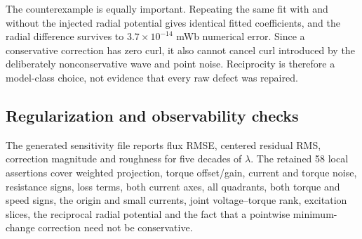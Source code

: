 The counterexample is equally important. Repeating the same fit with and without
the injected radial potential gives identical fitted coefficients, and the
radial difference survives to $3.7\times10^{-14}$ mWb numerical error. Since a
conservative correction has zero curl, it also cannot cancel curl introduced by
the deliberately nonconservative wave and point noise. Reciprocity is therefore
a model-class choice, not evidence that every raw defect was repaired.

\subsection{Regularization and observability checks}
The generated sensitivity file reports flux RMSE, centered residual RMS,
correction magnitude and roughness for five decades of $\lambda$. The retained
58 local assertions cover weighted projection, torque offset/gain, current and
torque noise, resistance signs, loss terms, both current axes, all quadrants,
both torque and speed signs, the origin and small currents, joint voltage--torque
rank, excitation slices, the reciprocal radial potential and the fact that a
pointwise minimum-change correction need not be conservative.
